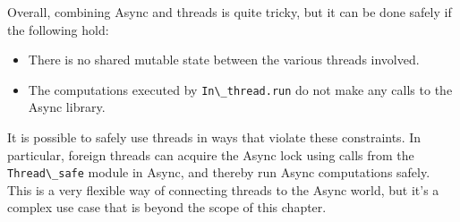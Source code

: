 Overall, combining Async and threads is quite tricky, but it can be done
safely if the following hold:

\begin{itemize}
\item
  There is no shared mutable state between the various threads involved.
\item
  The computations executed by \passthrough{\lstinline!In\_thread.run!}
  do not make any calls to the Async library.
\end{itemize}

It is possible to safely use threads in ways that violate these
constraints. In particular, foreign threads can acquire the Async lock
using calls from the \passthrough{\lstinline!Thread\_safe!} module in
Async, and thereby run Async computations safely. This is a very
flexible way of connecting threads to the Async world, but it's a
complex use case that is beyond the scope of this chapter. ~~
